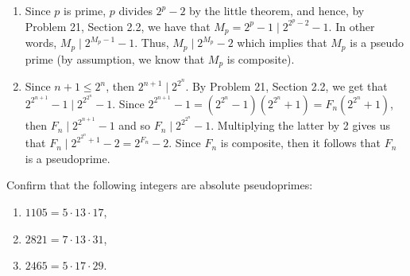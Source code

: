 \begin{solution}
    \begin{enumerate}
        \item Since $p$ is prime, $p$ divides $2^p - 2$ by the little theorem, and hence, by Problem 21, Section 2.2, we have that $M_p = 2^{p} - 1 \mid 2^{2^p - 2} - 1$. In other words, $M_p \mid 2^{M_p - 1} - 1$. Thus, $M_p \mid 2^{M_p} - 2$ which implies that $M_p$ is a pseudo prime (by assumption, we know that $M_p$ is composite).
        \item Since $n + 1 \leq 2^n$, then $2^{n+1} \mid 2^{2^n}$. By Problem 21, Section 2.2, we get that $2^{2^{n+1}} - 1 \mid 2^{2^{2^n}} - 1$. Since $2^{2^{n+1}} - 1 = (2^{2^n} - 1)(2^{2^n} + 1) = F_n(2^{2^n} + 1)$, then $F_n \mid 2^{2^{n+1}} - 1$ and so $F_n \mid 2^{2^{2^n}} - 1$. Multiplying the latter by 2 gives us that $F_n \mid 2^{2^{2^n} + 1} - 2 = 2^{F_n} - 2$. Since $F_n$ is composite, then it follows that $F_n$ is a pseudoprime.\\
    \end{enumerate}
\end{solution}

\begin{exercise}
    Confirm that the following integers are absolute pseudoprimes:
    \begin{enumerate}
        \item $1105 = 5 \cdot 13 \cdot 17$,
        \item $2821 = 7 \cdot 13 \cdot 31$,
        \item $2465 = 5 \cdot 17 \cdot 29$.
    \end{enumerate}
\end{exercise}

